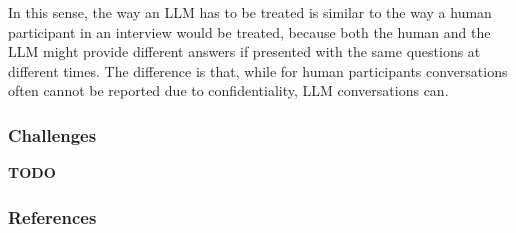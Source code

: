 \documentclass[11pt]{article}
\begin{document}
In this sense, the way an LLM has to be treated is similar to the way a human participant in an interview would be treated, because both the human and the LLM might provide different answers if presented with the same questions at different times.
The difference is that, while for human participants conversations often cannot be reported due to confidentiality, LLM conversations can.

\subsubsection{Challenges}

\textbf{TODO}

\subsubsection{References}



\end{document}
